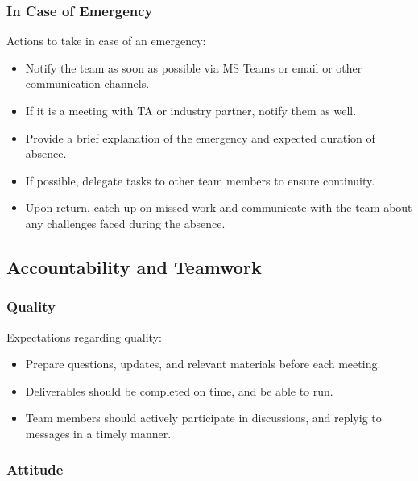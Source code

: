 \documentclass{article}
\begin{document}
\subsubsection*{In Case of Emergency}

Actions to take in case of an emergency:
\begin{itemize}
  \item Notify the team as soon as possible via MS Teams or email or other communication channels.
  \item If it is a meeting with TA or industry partner, notify them as well.
  \item Provide a brief explanation of the emergency and expected duration of absence.
  \item If possible, delegate tasks to other team members to ensure continuity.
  \item Upon return, catch up on missed work and communicate with the team about any challenges faced during the absence.
\end{itemize}

\subsection*{Accountability and Teamwork}

\subsubsection*{Quality} 

Expectations regarding quality:
\begin{itemize}
  \item Prepare questions, updates, and relevant materials before each meeting.
  \item Deliverables should be completed on time, and be able to run.
  \item Team members should actively participate in discussions, and replyig to messages in a timely manner.
\end{itemize}

\subsubsection*{Attitude}
\end{document}

